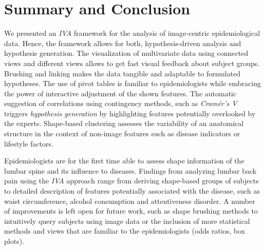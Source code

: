 \documentclass[journal]{style/vgtc} 			          %
\newcommand{\rem}[1]{\textcolor{red}{\sout{#1}}}
\newcommand{\com}[1]{\textcolor{orange}{\uline{#1}}}
\begin{document}
\section{Summary and Conclusion}
We presented an \emph{IVA} framework for the analysis of image-centric epidemiological data.
%
Hence, the framework allows for both, hypothesis-driven analysis and hypothesis generation.
%
The visualization of multivariate data using connected views and different views allows to get fast visual feedback about subject groups.
%
Brushing and linking makes the data tangible and adaptable to formulated hypotheses.
%
The use of pivot tables is familiar to epidemiologists while embracing the power of interactive adjustment of the shown features.
%
The automatic suggestion of correlations using contingency methods, such as \emph{Cram\'{e}r's V} triggers \emph{hypothesis generation} by highlighting features potentially overlooked by the experts.
%
Shape-based clustering assesses the variability of an anatomical structure in the context of non-image features such as disease indicators or lifestyle factors.

Epidemiologists are for the first time able to assess shape information of the lumbar spine and its influence to diseases.
%
Findings from analyzing lumbar back pain using the \emph{IVA} approach range from deriving shape-based groups of subjects to detailed description of features potentially associated with the disease, such as waist circumference, alcohol consumption and attentiveness disorder.
%
%
A number of improvements is left open for future work, such as shape brushing methods to intuitively query subjects using image data or the inclusion of more statistical methods and views that are familiar to the epidemiologists (odds ratios, box plots).
\end{document}
